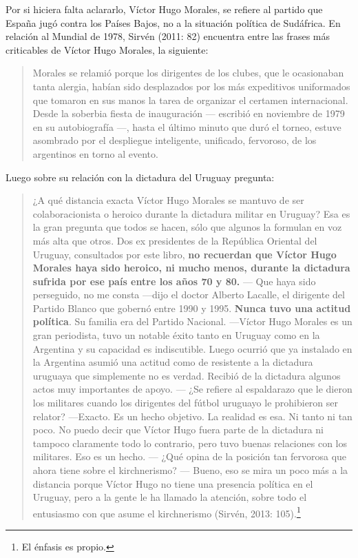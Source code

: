 {Por si hiciera falta aclararlo, Víctor Hugo Morales, se refiere al partido que España jugó contra los Países Bajos, no a la situación política de Sudáfrica. En relación al Mundial de 1978, Sirvén (2011: 82) encuentra entre las frases más criticables de Víctor Hugo Morales, la siguiente:

\begin{quote}
Morales se relamió porque los dirigentes de los clubes, que le ocasionaban tanta alergia, habían sido desplazados por los más expeditivos uniformados que tomaron en sus manos la tarea de organizar el certamen internacional. Desde la soberbia fiesta de inauguración --- escribió en noviembre de 1979 en su autobiografía ---, hasta el último minuto que duró el torneo, estuve asombrado por el despliegue inteligente, unificado, fervoroso, de los argentinos en torno al evento.
\end{quote}

Luego sobre su relación con la dictadura del Uruguay pregunta:

\begin{quote}
¿A qué distancia exacta Víctor Hugo Morales se mantuvo de ser colaboracionista o heroico durante la dictadura militar en Uruguay? Esa es la gran pregunta que todos se hacen, sólo que algunos la formulan en voz más alta que otros. Dos ex presidentes de la República Oriental del Uruguay, consultados por este libro, \textbf{no recuerdan que Víctor Hugo Morales haya sido heroico, ni mucho menos, durante la dictadura sufrida por ese país entre los años 70 y 80.} --- Que haya sido perseguido, no me consta ---dijo el doctor Alberto Lacalle, el dirigente del Partido Blanco que gobernó entre 1990 y 1995. \textbf{Nunca tuvo una actitud política}. Su familia era del Partido Nacional. ---Víctor Hugo Morales es un gran periodista, tuvo un notable éxito tanto en Uruguay como en la Argentina y su capacidad es indiscutible. Luego ocurrió que ya instalado en la Argentina asumió una actitud como de resistente a la dictadura uruguaya que simplemente no es verdad. Recibió de la dictadura algunos actos muy importantes de apoyo. --- ¿Se refiere al espaldarazo que le dieron los militares cuando los dirigentes del fútbol uruguayo le prohibieron ser relator? ---Exacto. Es un hecho objetivo. La realidad es esa. Ni tanto ni tan poco. No puedo decir que Víctor Hugo fuera parte de la dictadura ni tampoco claramente todo lo contrario, pero tuvo buenas relaciones con los militares. Eso es un hecho. --- ¿Qué opina de la posición tan fervorosa que ahora tiene sobre el kirchnerismo? --- Bueno, eso se mira un poco más a la distancia porque Víctor Hugo no tiene una presencia política en el Uruguay, pero a la gente le ha llamado la atención, sobre todo el entusiasmo con que asume el kirchnerismo (Sirvén, 2013: 105).\footnote{El énfasis es propio.}
\end{quote}

}
